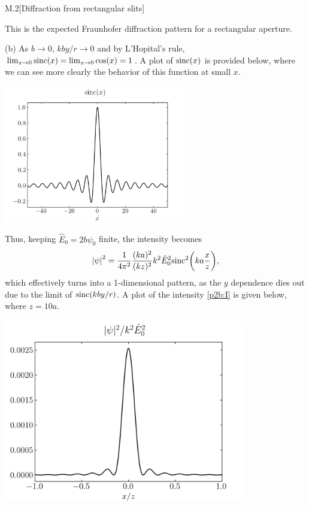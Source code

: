 \documentclass[12pt]{article}
\begin{document}
\begin{problem}{M.2}[Diffraction from rectangular slits]
\begin{solution}
\begin{center}
\end{center}
This is the expected Fraunhofer diffraction pattern for a rectangular aperture.

(b) As $b\to0$, $kby/r\to0$ and by L'Hopital's rule,
$\lim_{x\to0}\text{sinc}(x)=\lim_{x\to0}\cos(x)=1$. A plot of $\text{sinc}(x)$ is
provided below, where we can see more clearly the behavior of this function at
small $x$.
\begin{center}
    \includegraphics[width=0.6\textwidth]{p2b.png} 
\end{center}

Thus, keeping
$\hat{E}_0=2b\psi_0$ finite, the intensity becomes
\begin{equation}\label{p2b:I}
    \abs{\psi}^2=\frac1{4\pi^2}\frac{(ka)^2}{(kz)^2}k^2\hat{E}_0^2\text{sinc}^2\qty(ka\frac{x}{z}),
\end{equation}
which effectively turns into a 1-dimensional pattern, as the $y$ dependence dies
out due to the limit of $\text{sinc}(kby/r)$. A plot of the intensity \eqref{p2b:I}
is given below, where $z=10a$.
\begin{center}
    \includegraphics[width=0.8\textwidth]{p2b2.png} 
\end{center}


\end{solution}
\end{problem}
\end{document}
